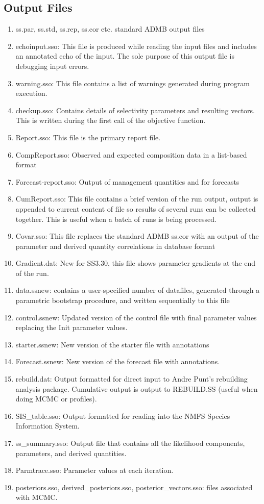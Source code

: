 	\subsection{Output Files}
	\begin{enumerate}
		\item ss.par, ss.std, ss.rep, ss.cor etc.  standard ADMB output files
		\item echoinput.sso:  This file is produced while reading the input files and includes an annotated echo of the input.  The sole purpose of this output file is debugging input errors.
		\item warning.sso:  This file contains a list of warnings generated during program execution.
		\item checkup.sso:  Contains details of selectivity parameters and resulting vectors.  This is written during the first call of the objective function.
		\item Report.sso:  This file is the primary report file.
		\item CompReport.sso:  Observed and expected composition data in a list-based format
		\item Forecast-report.sso:  Output of management quantities and for forecasts
		\item CumReport.sso:  This file contains a brief version of the run output, output is appended to current content of file so results of several runs can be collected together.  This is useful when a batch of runs is being processed.
		\item Covar.sso:  This file replaces the standard ADMB ss.cor with an output of the parameter and derived quantity correlations in database format
		\item Gradient.dat: New for SS3.30, this file shows parameter gradients at the end of the run.
		\item data.ss\textunderscore new:  contains a user-specified number of datafiles, generated through a parametric bootstrap procedure, and written sequentially to this file
		\item control.ss\textunderscore new:  Updated version of the control file with final parameter values replacing the Init parameter values.
		\item starter.ss\textunderscore new:  New version of the starter file with annotations
		\item Forecast.ss\textunderscore new:  New version of the forecast file with annotations.
		\item rebuild.dat:  Output formatted for direct input to Andre Punt's rebuilding analysis package.  Cumulative output is output to REBUILD.SS (useful when doing MCMC or profiles).
		\item SIS\_table.sso:  Output formatted for reading into the NMFS Species Information System.
		\item ss\_summary.sso: Output file that contains all the likelihood components, parameters, and derived quantities. 
		\item Parmtrace.sso: Parameter values at each iteration.
		\item posteriors.sso, derived\_posteriors.sso, posterior\_vectors.sso: files associated with MCMC.
	\end{enumerate}

